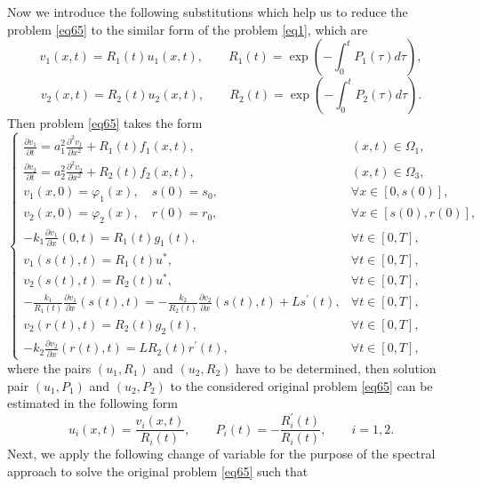 \documentclass[preprint,12pt,authoryear]{elsarticle}
\begin{document}
Now we introduce the following substitutions which help us to reduce the problem \eqref{eq65} to the similar form of the problem \eqref{eq1}, which are
\begin{equation}\label{eq66}
    v_1(x,t)=R_1(t)u_1(x,t),\quad\quad R_1(t)=\exp\left(-\int_0^t P_1(\tau)d\tau\right),
\end{equation}
\begin{equation}\label{eq67}
    v_2(x,t)=R_2(t)u_2(x,t),\quad\quad R_2(t)=\exp\left(-\int_0^t P_2(\tau)d\tau\right).
\end{equation}
Then problem \eqref{eq65} takes the form
\begin{equation}\label{eq68}
    \begin{cases}
        \frac{\partial v_1}{\partial t}=a_1^2\frac{\partial^2 v_1}{\partial x^2}+R_1(t)f_1(x,t),& (x,t)\in\Omega_1,\\
        \frac{\partial v_2}{\partial t}=a_2^2\frac{\partial^2 v_2}{\partial x^2}+R_2(t)f_2(x,t),& (x,t)\in\Omega_3,\\
        v_1(x,0)=\varphi_1(x),\quad s(0)=s_0,& \forall x\in[0,s(0)],\\
        v_2(x,0)=\varphi_2(x),\quad r(0)=r_0,&\forall x\in[s(0),r(0)],\\
        -k_1\frac{\partial v_1}{\partial x}(0,t)=R_1(t)g_1(t),&\forall t\in[0,T],\\
        v_1(s(t),t)=R_1(t)u^*,&\forall t\in[0,T],\\
        v_2(s(t),t)=R_2(t)u^*,&\forall t\in[0,T],\\
        -\frac{k_1}{R_1(t)}\frac{\partial v_1}{\partial x}(s(t),t)=-\frac{k_2}{R_2(t)}\frac{\partial v_2}{\partial x}(s(t),t)+Ls^{\prime}(t),&\forall t\in[0,T],\\
        v_2(r(t),t)=R_2(t)g_2(t),&\forall t\in[0,T],\\
        -k_2\frac{\partial v_2}{\partial x}(r(t),t)=LR_2(t)r^{\prime}(t),&\forall t\in[0,T],
    \end{cases}
\end{equation}
where the pairs $(u_1, R_1)$ and $(u_2, R_2)$ have to be determined, then solution pair $(u_1,P_1)$ and $(u_2,P_2)$ to the considered original problem \eqref{eq65} can be estimated in the following form
\begin{equation}\label{eq69}
    u_i(x,t)=\frac{v_i(x,t)}{R_i(t)},\quad \quad P_i(t)=-\frac{R_i^{\prime}(t)}{R_i(t)},\quad\quad i=1,2.
\end{equation}
Next, we apply the following change of variable for the purpose of the spectral approach to solve the original problem \eqref{eq65} such that
\end{document}

